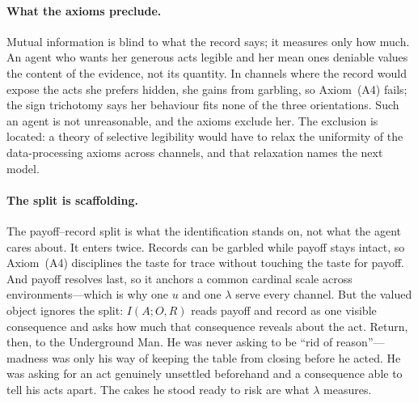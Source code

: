 \documentclass[11pt,a4paper]{article}
\theoremstyle{definition}
\newcommand{\1}{\mathbf 1}
\begin{document}
\paragraph{What the axioms preclude.}
Mutual information is blind to what the record says; it measures only how much.  An agent who wants her generous
acts legible and her mean ones deniable values the content of the evidence, not its quantity.  In channels where
the record would expose the acts she prefers hidden, she gains from garbling, so Axiom~\textup{(A4)} fails; the
sign trichotomy says her behaviour fits none of the three orientations.  Such an agent is not unreasonable, and
the axioms exclude her.  The exclusion is located: a theory of selective legibility would have to relax the
uniformity of the data-processing axioms across channels, and that relaxation names the next model.

\paragraph{The split is scaffolding.}
The payoff--record split is what the identification stands on, not what the agent cares about.  It
enters twice.  Records can be garbled while payoff stays intact, so Axiom~\textup{(A4)} disciplines
the taste for trace without touching the taste for payoff.  And payoff resolves last, so it anchors
a common cardinal scale across environments---which is why one $u$ and one $\lambda$ serve every
channel.  But the valued object ignores the split: $I(A;O,R)$ reads payoff and record as one
visible consequence and asks how much that consequence reveals about the act.  Return, then, to the
Underground Man.  He was never asking to be ``rid of reason''---madness was only his way of keeping
the table from closing before he acted.  He was asking for an act genuinely unsettled beforehand
and a consequence able to tell his acts apart.  The cakes he stood ready to risk are what
$\lambda$ measures.
\end{document}
